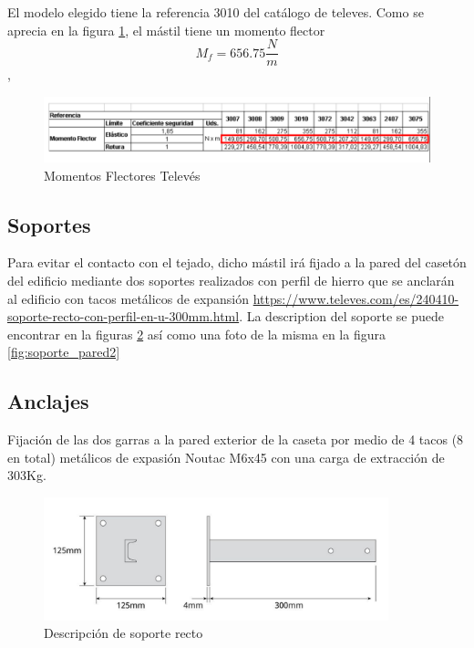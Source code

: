\documentclass[letterpaper, 10pt]{article} %
\begin{document}
El modelo elegido tiene la referencia 3010 del catálogo de televes. Como se aprecia en la figura \ref{fig:mflector}, el mástil tiene un momento flector
\begin{equation}\label{momentoflector}
\textbf{$M_f =  656.75 \frac{N}{m}$}
\end{equation}, 

\begin{figure}[h!]
	\centering
	\includegraphics[width=17cm]{img/momentos_flectores.pdf}
	\caption{Momentos Flectores Televés}
	\label{fig:mflector}
\end{figure}


\subsection{Soportes}
Para evitar el contacto con el tejado, dicho mástil irá fijado a la pared del casetón del edificio mediante dos soportes realizados con perfil de hierro que se anclarán al edificio con tacos metálicos de expansión \url{https://www.televes.com/es/240410-soporte-recto-con-perfil-en-u-300mm.html}. La description del soporte se puede encontrar en la figuras \ref{fig:soporte_pared1} así como una foto de la misma en la figura \ref{fig:soporte_pared2}   

\subsection{Anclajes}
Fijación de las dos garras a la pared exterior de la caseta por medio de 4 tacos (8 en total) metálicos de expasión Noutac M6x45 con una carga de extracción de 303Kg.

\begin{figure}[h!]
	\centering
	\includegraphics[width=10cm]{img/soporte_pared1.pdf}
	\caption{Descripción de soporte recto}
	\label{fig:soporte_pared1}
\end{figure}
\end{document}
